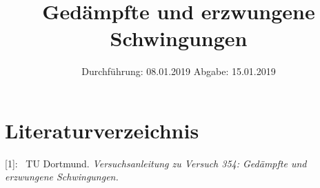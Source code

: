 

\subject{Nr.354}
\title{Gedämpfte und erzwungene Schwingungen}
\date{
  Durchführung: 08.01.2019
  \hspace{3em}
  Abgabe: 15.01.2019
}



\maketitle
\thispagestyle{empty}
\tableofcontents
\newpage






\section{Literaturverzeichnis}

[1]: \ TU Dortmund. \textit{Versuchsanleitung zu Versuch 354:
Gedämpfte und erzwungene Schwingungen.}\newline

\printbibliography{}


